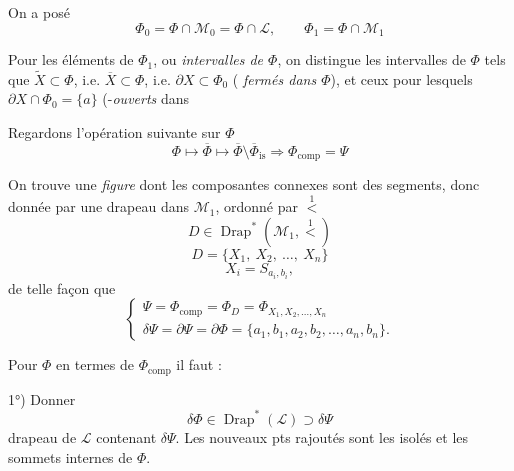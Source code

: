 \documentclass[11pt,a4paper]{article}
\begin{document}
 On a posé
\[ \Phi_0 = \Phi\cap\mathcal{M}_0 = \Phi\cap\mathcal{L}, \qquad \Phi_1 = \Phi\cap\mathcal{M}_1 \]

Pour les éléments de $\Phi_1$, ou \emph{intervalles de $\Phi$}, on distingue les intervalles de $\Phi$ tels que $\widetilde{X}\subset\Phi$, i.e. $\overline{X}\subset\Phi$, i.e. $\partial X\subset\Phi_0$ ( \emph{fermés dans $\Phi$}), et ceux pour lesquels $\partial X\cap\Phi_0=\{a\}$ (-\emph{ouverts} dans

Regardons l'opération suivante sur $\Phi$
\[ \Phi \longmapsto \overline{\Phi} \longmapsto \overline{\Phi}\setminus\overline{\Phi}_{\mathrm{is}} \Longrightarrow \Phi_{\mathrm{comp}} = \Psi \]

On trouve une \emph{figure} dont les composantes connexes sont des segments, donc donnée par une  drapeau dans $\mathcal{M}_1$, ordonné par $\overset{1}{<}$
\[ D \in \operatorname{Drap}^*(\mathcal{M}_1,\overset{1}{<}) \]
\[ D = \{X_1,\ X_2,\ \ldots,\ X_n\} \]
\[ X_i = S_{a_i,b_i}, \]
de telle façon que
\[ \begin{cases}
\Psi = \Phi_{\mathrm{comp}} = \Phi_D = \Phi_{X_1,X_2,\ldots,X_n} \\
\delta\Psi = \partial\Psi = \partial\Phi = \{a_1,b_1,a_2,b_2,\ldots,a_n,b_n\} .
\end{cases} \]

Pour    $\Phi$ en termes de $\Phi_{\mathrm{comp}}$ il faut :

1°) Donner
\[ \delta\Phi \in \operatorname{Drap}^*(\mathcal{L}) \supset \delta\Psi \]
drapeau de $\mathcal{L}$ contenant $\delta\Psi$. Les nouveaux pts rajoutés\add{*} sont   les  isolés et les sommets internes de $\Phi$.


\end{document}
